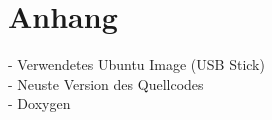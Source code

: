 \section{Anhang}

- Verwendetes Ubuntu Image (USB Stick)\\
- Neuste Version des Quellcodes\\
- Doxygen
\newpage